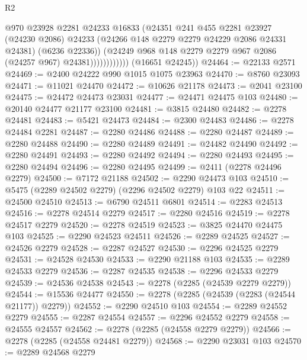 \begin{lexlean}{R2}
\begin{coremodule}
                            @970
                            @23928
                            @2281
                            @24233
                            @16833
                            (@24351
                              @241
                              @455
                              @2281
                              @23927
                              (@24230 @2086)
                              @24233
                              (@24266 @148 @2279 @2279 @24229 @2086 @24331 @24381)
                              (@6236 @22336))
                            (@24249
                              @968
                              @148
                              @2279
                              @2279
                              @967
                              @2086
                              (@24257 @967)
                              @24381))))))))))))
      (@16651 @24245))
@24464 := @22133 @2571
@24469 := @2400 @24222 @990 @1015 @1075 @23963
@24470 := @8760 @23093
@24471 := @11021 @24470
@24472 := @10626 @21178
@24473 := @2041 @23100
@24475 := @24472 @24473 @23031
@24477 := @24471 @24475 @103
@24480 := @20140 @24477 @21177 @23100
@24481 := @3815 @24480
@24482 := @2278 @24481
@24483 := @5421 @24473
@24484 := @2300 @24483
@24486 := @2278 @24484 @2281
@24487 := @2280 @24486
@24488 := @2280 @24487
@24489 := @2280 @24488
@24490 := @2280 @24489
@24491 := @24482 @24490
@24492 := @2280 @24491
@24493 := @2280 @24492
@24494 := @2280 @24493
@24495 := @2280 @24494
@24496 := @2280 @24495
@24499 := @2411 (@2278 @24496 @2279)
@24500 := @7172 @21188
@24502 := @2290 @24473 @103
@24510 := @5475 (@2289 @24502 @2279) (@2296 @24502 @2279) @103 @22
@24511 := @24500 @24510
@24513 := @6790 @24511 @6801
@24514 := @2283 @24513
@24516 := @2278 @24514 @2279
@24517 := @2280 @24516
@24519 := @2278 @24517 @2279
@24520 := @2278 @24519
@24523 := @3825 @24470 @24475 @103
@24525 := @2290 @24523 @24511
@24526 := @2289 @24525
@24527 := @24526 @2279
@24528 := @2287 @24527
@24530 := @2296 @24525 @2279
@24531 := @24528 @24530
@24533 := @2290 @21188 @103
@24535 := @2289 @24533 @2279
@24536 := @2287 @24535
@24538 := @2296 @24533 @2279
@24539 := @24536 @24538
@24543 := @2278 (@2285 (@24539 @2279 @2279))
@24544 := @15536 @24477
@24550 := @2278 (@2285 (@24539 (@2283 (@24544 @21177)) @2279))
@24552 := @2290 @24510 @103
@24554 := @2289 @24552 @2279
@24555 := @2287 @24554
@24557 := @2296 @24552 @2279
@24558 := @24555 @24557
@24562 := @2278 (@2285 (@24558 @2279 @2279))
@24566 := @2278 (@2285 (@24558 @24481 @2279))
@24568 := @2290 @23031 @103
@24570 := @2289 @24568 @2279

\end{coremodule}
\end{lexlean}
